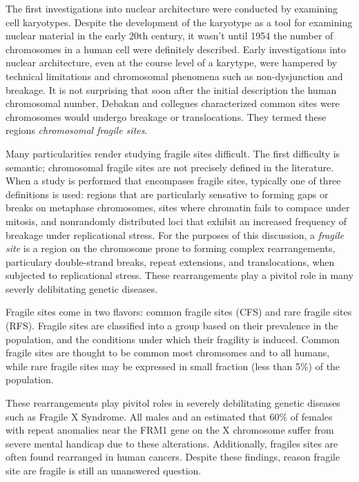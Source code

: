 \documentclass[phd,tocprelim]{cornell}
\begin{document}
The first investigations into nuclear architecture were conducted by
examining cell karyotypes.  Despite the development of the karyotype as a
tool for examining nuclear material in the early 20th
century\cite{levitsky1924}, it wasn't until 1954 the number of chromosomes in
a human cell were definitely described\cite{tjio1956}.  Early investigations
into nuclear architecture, even at the course level of a karytype, were
hampered by technical limitations and chromosomal phenomena such as
non-dysjunction and breakage.  It is not surprising that soon after the
initial description the human chromosomal number, Debakan and collegues
characterized common sites were chromosomes would undergo breakage or
translocations.  They termed these regions
\textit{chromosomal fragile sites}\cite{leyden2008}.

Many particularities render studying fragile sites difficult.  The
first difficulty is semantic; chromosomal fragile sites are not precisely
defined in the literature.  When a study is performed that encompases fragile
sites, typically one of three definitions is used: regions that are particularly
sensative to forming gaps or breaks on metaphase chromosomes\cite{glover2005},
sites where chromatin fails to compace under mitosis\cite{leyden2008}, and
nonrandomly distributed loci that exhibit an increased frequency of breakage
under replicational stress\cite{franchitto2013}.  For the purposes of this
discussion, a \textit{fragile site} is a region on the chromosome prone to
forming complex rearrangements, particulary double-strand breaks, repeat
extensions, and translocations, when subjected to replicational stress.  These
rearrangements play a pivitol role in many severly delibitating genetic
diseases.

Fragile sites come in two flavors: common fragile sites (CFS) and rare fragile
sites (RFS).  Fragile sites are classified into a group based on their
prevalence in the population, and the conditions under which their fragility
is induced\cite{leyden2008}.  Common fragile sites are thought to be common
most chromsomes and to all humans, while rare fragile sites may be expressed
in small fraction (less than 5\%) of the population\cite{wells2006}.

  These
rearrangements play pivitol roles in severely debilitating genetic diseases
such as Fragile X Syndrome.  All males and an estimated that 60\% of females
with repeat anomalies near the FRM1 gene on the X chromosome suffer
from severe mental handicap due to these alterations\cite{sutherland1995}.
Additionally, fragiles sites are often found rearranged in human
cancers\cite{glover2005}.  Despite these findings, reason fragile site are
fragile is still an unanswered question.
\end{document}
